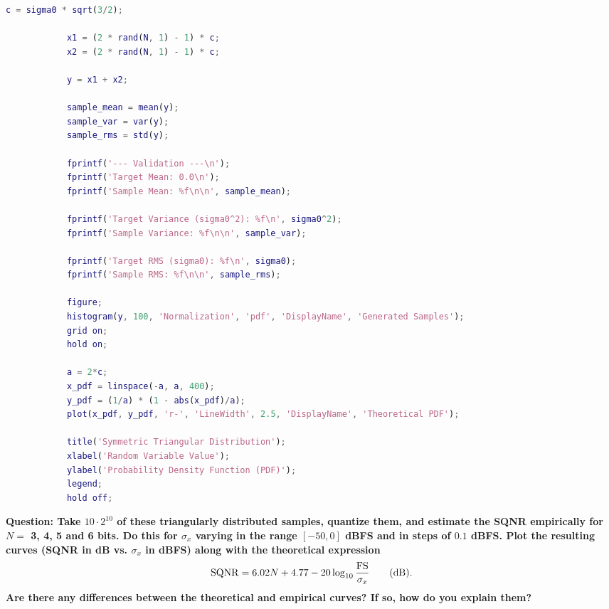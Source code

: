 \documentclass[11pt,a4paper]{article}
\begin{document}
\begin{itemize}
\begin{lstlisting}[language=Matlab]
            c = sigma0 * sqrt(3/2);

            x1 = (2 * rand(N, 1) - 1) * c;
            x2 = (2 * rand(N, 1) - 1) * c;

            y = x1 + x2;

            sample_mean = mean(y);
            sample_var = var(y);
            sample_rms = std(y);

            fprintf('--- Validation ---\n');
            fprintf('Target Mean: 0.0\n');
            fprintf('Sample Mean: %f\n\n', sample_mean);

            fprintf('Target Variance (sigma0^2): %f\n', sigma0^2);
            fprintf('Sample Variance: %f\n\n', sample_var);

            fprintf('Target RMS (sigma0): %f\n', sigma0);
            fprintf('Sample RMS: %f\n\n', sample_rms);

            figure;
            histogram(y, 100, 'Normalization', 'pdf', 'DisplayName', 'Generated Samples');
            grid on;
            hold on;

            a = 2*c;
            x_pdf = linspace(-a, a, 400);
            y_pdf = (1/a) * (1 - abs(x_pdf)/a);
            plot(x_pdf, y_pdf, 'r-', 'LineWidth', 2.5, 'DisplayName', 'Theoretical PDF');

            title('Symmetric Triangular Distribution');
            xlabel('Random Variable Value');
            ylabel('Probability Density Function (PDF)');
            legend;
            hold off;
        \end{lstlisting}
\end{itemize}

\vspace{1cm}
\textbf{Question: Take $10\cdot 2^{10}$ of these triangularly distributed samples, quantize them, and estimate the SQNR empirically
    for $N=$ 3, 4, 5 and 6 bits. Do this for $\sigma_x$ varying in the range $[-50, 0]$ dBFS and in steps of $0.1$ dBFS. Plot the
    resulting curves (SQNR in dB vs. $\sigma_x$ in dBFS) along with the theoretical expression
    \begin{equation}\label{eq:sqnr}
        {\rm SQNR} = 6.02 N + 4.77-20\log_{10}\frac{\rm FS}{\sigma_x} \qquad \mbox{(dB).}
    \end{equation}
    Are there any differences between the theoretical and empirical curves? If so, how do you explain them?}
\vspace{0.5cm}
\end{document}
